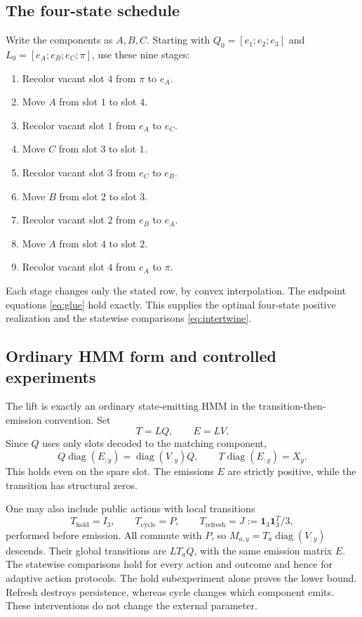 \documentclass[11pt]{article}
\theoremstyle{definition}\newtheorem{definition}[theorem]{Definition}
\theoremstyle{remark}\newtheorem{remark}[theorem]{Remark}
\newcommand{\one}{\mathbf 1}
\newcommand{\diag}{\operatorname{diag}}
\begin{document}
\subsection{The four-state schedule}
Write the components as $A,B,C$. Starting with $Q_0=[e_1;e_2;e_3]$ and $L_0=[e_A;e_B;e_C;\pi]$, use these nine stages:
\begin{enumerate}
\item Recolor vacant slot $4$ from $\pi$ to $e_A$.
\item Move $A$ from slot $1$ to slot $4$.
\item Recolor vacant slot $1$ from $e_A$ to $e_C$.
\item Move $C$ from slot $3$ to slot $1$.
\item Recolor vacant slot $3$ from $e_C$ to $e_B$.
\item Move $B$ from slot $2$ to slot $3$.
\item Recolor vacant slot $2$ from $e_B$ to $e_A$.
\item Move $A$ from slot $4$ to slot $2$.
\item Recolor vacant slot $4$ from $e_A$ to $\pi$.
\end{enumerate}
Each stage changes only the stated row, by convex interpolation. The endpoint equations \eqref{eq:glue} hold exactly. This supplies the optimal four-state positive realization and the statewise comparisons \eqref{eq:intertwine}.

\subsection{Ordinary HMM form and controlled experiments}
The lift is exactly an ordinary state-emitting HMM in the transition-then-emission convention. Set
\[
 T=LQ,\qquad E=LV.
\]
Since $Q$ uses only slots decoded to the matching component,
\[
 Q\diag(E_{:y})=\diag(V_{:y})Q,\qquad
 T\diag(E_{:y})=X_y.
\]
This holds even on the spare slot. The emissions $E$ are strictly positive, while the transition has structural zeros.

One may also include public actions with local transitions
\[
 T_{\mathrm{hold}}=I_3,\qquad T_{\mathrm{cycle}}=P,\qquad
 T_{\mathrm{refresh}}=J:=\one_3\one_3^T/3,
\]
performed before emission. All commute with $P$, so $M_{a,y}=T_a\diag(V_{:y})$ descends. Their global transitions are $LT_aQ$, with the same emission matrix $E$. The statewise comparisons hold for every action and outcome and hence for adaptive action protocols. The hold subexperiment alone proves the lower bound. Refresh destroys persistence, whereas cycle changes which component emits. These interventions do not change the external parameter.
\end{document}
